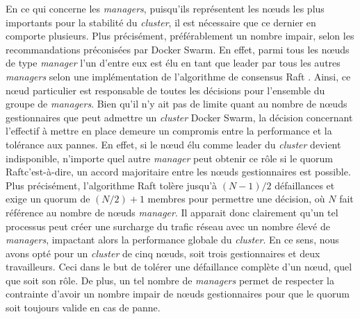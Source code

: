 En ce qui concerne les \textit{managers}, puisqu'ils représentent les n\oe{}uds les plus importants pour la stabilité du \textit{cluster}, il est nécessaire que ce dernier en comporte plusieurs. Plus précisément, préférablement un nombre impair, selon les recommandations préconisées par Docker Swarm. En effet, parmi tous les n\oe{}uds de type \textit{manager} l'un d'entre eux est élu en tant que leader par tous les autres \textit{managers} selon une implémentation de l'algorithme de consensus Raft \citep{MacKenzie2006}. Ainsi, ce n\oe{}ud particulier est responsable de toutes les décisions pour l'ensemble du groupe de \textit{managers}. Bien qu'il n'y ait pas de limite quant au nombre de n\oe{}uds gestionnaires que peut admettre un \textit{cluster} Docker Swarm, la décision concernant l'effectif à mettre en place demeure un compromis entre la performance et la tolérance aux pannes. En effet, si le n\oe{}ud élu comme leader du \textit{cluster} devient indisponible, n'importe quel autre \textit{manager} peut obtenir ce rôle si le quorum Raft\textemdash c'est-à-dire, un accord majoritaire entre les n\oe{}uds gestionnaires est possible. Plus précisément, l'algorithme Raft tolère jusqu'à $(N -1)/2$ défaillances et exige un quorum de $(N/2) + 1$ membres pour permettre une décision, où $N$ fait référence au nombre de n\oe{}uds \textit{manager}. Il apparait donc clairement qu'un tel processus peut créer une surcharge du trafic réseau avec un nombre élevé de \textit{managers}, impactant alors la performance globale du \textit{cluster}. En ce sens, nous avons opté pour un \textit{cluster} de cinq n\oe{}uds, soit trois gestionnaires et deux travailleurs. Ceci dans le but de tolérer une défaillance complète d'un n\oe{}ud, quel que soit son rôle. De plus, un tel nombre de \textit{managers} permet de respecter la contrainte d'avoir un nombre impair de n\oe{}uds gestionnaires pour que le quorum soit toujours valide en cas de panne.

